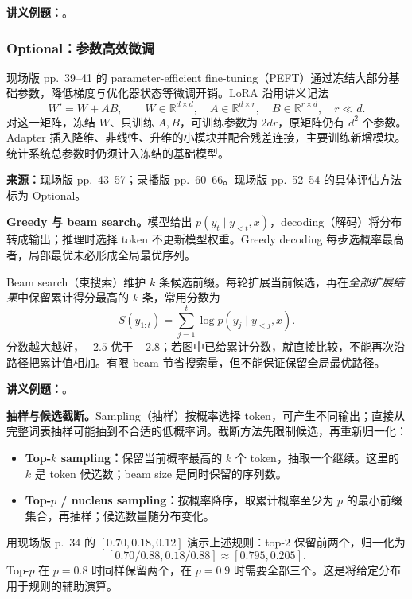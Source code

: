 \textbf{讲义例题：}。

\subsubsection{Optional：参数高效微调}

现场版 pp.~39--41 的 parameter-efficient fine-tuning（PEFT）通过冻结大部分基础参数，降低梯度与优化器状态等微调开销。LoRA 沿用讲义记法
\[
 W'=W+AB,\qquad
 W\in\mathbb R^{d\times d},\quad
 A\in\mathbb R^{d\times r},\quad B\in\mathbb R^{r\times d},\quad r\ll d.
\]
对这一矩阵，冻结 $W$、只训练 $A,B$，可训练参数为 $2dr$，原矩阵仍有 $d^2$ 个参数。Adapter 插入降维、非线性、升维的小模块并配合残差连接，主要训练新增模块。统计系统总参数时仍须计入冻结的基础模型。

\nopagebreak[4]
\textbf{来源：}现场版 pp.~43--57；录播版 pp.~60--66。现场版 pp.~52--54 的具体评估方法标为 Optional。

\textbf{Greedy 与 beam search。}模型给出 $p(y_t\mid y_{<t},x)$，decoding（解码）将分布转成输出；推理时选择 token 不更新模型权重。Greedy decoding 每步选概率最高者，局部最优未必形成全局最优序列。

Beam search（束搜索）维护 $k$ 条候选前缀。每轮扩展当前候选，再在\emph{全部扩展结果}中保留累计得分最高的 $k$ 条，常用分数为
\[
 S(y_{1:t})=\sum_{j=1}^{t}\log p(y_j\mid y_{<j},x).
\]
分数越大越好，$-2.5$ 优于 $-2.8$；若图中已给累计分数，就直接比较，不能再次沿路径把累计值相加。有限 beam 节省搜索量，但不能保证保留全局最优路径。

\textbf{讲义例题：}。

\textbf{抽样与候选截断。}Sampling（抽样）按概率选择 token，可产生不同输出；直接从完整词表抽样可能抽到不合适的低概率词。截断方法先限制候选，再重新归一化：
\begin{itemize}
 \item \textbf{Top-$k$ sampling：}保留当前概率最高的 $k$ 个 token，抽取一个继续。这里的 $k$ 是 token 候选数；beam size 是同时保留的序列数。
 \item \textbf{Top-$p$ / nucleus sampling：}按概率降序，取累计概率至少为 $p$ 的最小前缀集合，再抽样；候选数量随分布变化。
\end{itemize}
用现场版 p.~34 的 $[0.70,0.18,0.12]$ 演示上述规则：top-$2$ 保留前两个，归一化为
\[
 [0.70/0.88,0.18/0.88]\approx[0.795,0.205].
\]
Top-$p$ 在 $p=0.8$ 时同样保留两个，在 $p=0.9$ 时需要全部三个。这是将给定分布用于规则的辅助演算。

